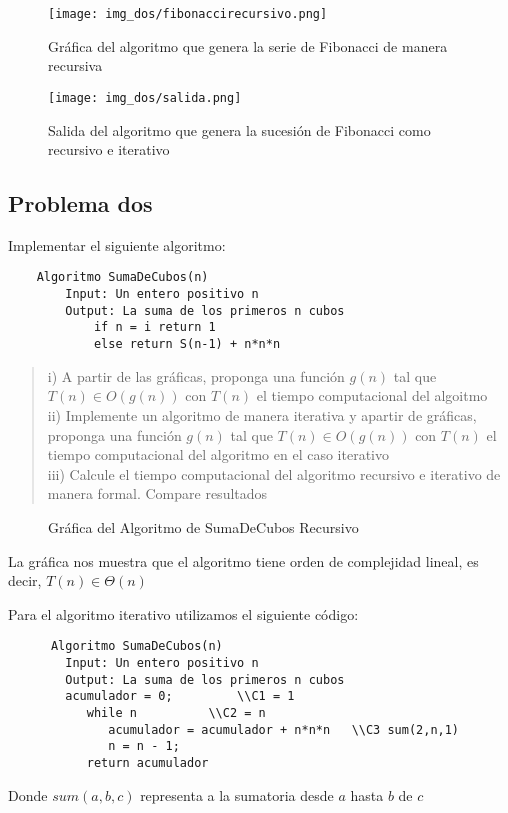 \documentclass[12pt,twoside]{article}
\newcommand{\addfigure}[4]{
        \begin{figure}[htbp!]
            \begin{center}	
                \fbox{\texttt{[image: \#2]}}
                \caption{#4}
                \label{#3}
            \end{center}
        \end{figure}
  }
\begin{document}
\vspace{3 mm}
\vspace{10 mm}
\begin{figure}[H]
\centering
\texttt{[image: img\_dos/fibonaccirecursivo.png]}
\caption{Gráfica del algoritmo que genera la serie de Fibonacci de manera recursiva}
\label{ejecucionEuclides}
\end{figure}
\vspace{3 mm}
\begin{figure}[H]
\centering
\texttt{[image: img\_dos/salida.png]}
\caption{Salida del algoritmo que genera la sucesión de Fibonacci como recursivo e iterativo}
\label{ejecucionEuclides}
\end{figure}
\subsection*{Problema dos}
Implementar el siguiente algoritmo:	
	\begin{lstlisting}
	Algoritmo SumaDeCubos(n)
    	Input: Un entero positivo n
        Output: La suma de los primeros n cubos
            if n = i return 1
            else return S(n-1) + n*n*n 
	\end{lstlisting}
     
		\begin{quote}
    		i) A partir de las gráficas, proponga una función $g(n)$ tal que $T(n) \in O(g(n))$ con $T(n)$ el tiempo computacional del algoitmo\\
            ii) Implemente un algoritmo de manera iterativa y apartir de gráficas, proponga una función $g(n)$ tal que $T(n) \in O(g(n))$ con $T(n)$ el tiempo computacional del algoritmo en el caso iterativo \\
            iii) Calcule el tiempo computacional del algoritmo recursivo e iterativo de manera formal. Compare resultados
    	\end{quote}

\addfigure{.8}{img_dos/Sumancubos}{fig:GraficaSuman}{Gráfica del Algoritmo de SumaDeCubos Recursivo}
    
    La gráfica nos muestra que el algoritmo tiene orden de complejidad lineal, es decir, $T(n) \in \Theta(n)$

 Para el algoritmo iterativo utilizamos el siguiente código:
	\begin{lstlisting}
      Algoritmo SumaDeCubos(n)
    	Input: Un entero positivo n
        Output: La suma de los primeros n cubos
	 	acumulador = 0;			\\C1 = 1
           while n 			\\C2 = n
              acumulador = acumulador + n*n*n 	\\C3 sum(2,n,1)
              n = n - 1;
           return acumulador
	\end{lstlisting}
    Donde $sum(a,b,c)$ representa a la sumatoria desde $a$ hasta $b$ de $c$
    
\end{document}
